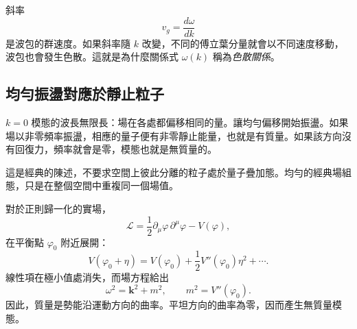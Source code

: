 \begin{classroomqa}
\end{classroomqa}

斜率
\begin{equation}
  v_g=\frac{d\omega}{dk}
\end{equation}
是波包的群速度。如果斜率隨 \(k\) 改變，不同的傅立葉分量就會以不同速度移動，波包也會發生色散。這就是為什麼關係式 \(\omega(k)\) 稱為\emph{色散關係}。

\begin{classroomqa}
\end{classroomqa}

\subsection{均勻振盪對應於靜止粒子}

\(k=0\) 模態的波長無限長：場在各處都偏移相同的量。讓均勻偏移開始振盪。如果場以非零頻率振盪，相應的量子便有非零靜止能量，也就是有質量。如果該方向沒有回復力，頻率就會是零，模態也就是無質量的。

這是經典的陳述，不要求空間上彼此分離的粒子處於量子疊加態。均勻的經典場組態，只是在整個空間中重複同一個場值。

\begin{classroomqa}
\end{classroomqa}

對於正則歸一化的實場，
\begin{equation}
  \mathcal L
  =\frac12\partial_\mu\varphi\,\partial^\mu\varphi-V(\varphi),
\end{equation}
在平衡點 \(\varphi_0\) 附近展開：
\begin{equation}
  V(\varphi_0+\eta)
  =V(\varphi_0)
   +\frac12V''(\varphi_0)\eta^2+\cdots.
\end{equation}
線性項在極小值處消失，而場方程給出
\begin{equation}
  \omega^2=\bm{k}^2+m^2,
  \qquad
  m^2=V''(\varphi_0).
  \label{eq:l08-curvature-mass}
\end{equation}
因此，質量是勢能沿運動方向的曲率。平坦方向的曲率為零，因而產生無質量模態。

